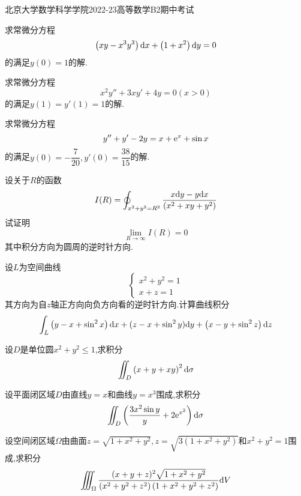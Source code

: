 \documentclass{ctexart}
\begin{document}
\pagestyle{empty}
\begin{center}\Large
    北京大学数学科学学院2022-23高等数学B2期中考试
\end{center}
\begin{problem}[1.(10\songti{分})]
    求常微分方程
    \[\left(xy-x^3y^3\right)\mathrm{d} x+\left(1+x^2\right)\mathrm{d} y=0\]
    的满足$y(0)=1$的解.
\end{problem}

\begin{problem}[2.(10\songti{分})]
    求常微分方程
    \[x^2y''+3xy'+4y=0(x>0)\]
    的满足$y(1)=y'(1)=1$的解.
\end{problem}

\begin{problem}[3.(10\songti{分})]
    求常微分方程
    \[y''+y'-2y=x+\mathrm{e}^x+\sin x\]
    的满足$y(0)=-\dfrac{7}{20},y'(0)=\dfrac{38}{15}$的解.
\end{problem}

\begin{problem}[4.(10\songti{分})]
    设关于$R$的函数
    \[I(R)=\oint_{x^2+y^2=R^2}\dfrac{x\mathrm{d} y-y\mathrm{d} x}{\left(x^2+xy+y^2\right)}\]
    试证明
    \[\lim_{R\to\infty}I(R)=0\]
    其中积分方向为圆周的逆时针方向.
\end{problem}

\begin{problem}[5.(10\songti{分})]
    设$L$为空间曲线
    \[\left\{\begin{array}{l}
        x^2+y^2=1\\
        x+z=1
    \end{array}\right.\]
    其方向为自$z$轴正方向向负方向看的逆时针方向.计算曲线积分
    \[\int_{L}\left(y-x+\sin^2x\right)\mathrm{d} x+(z-x+\sin^2y)\mathrm{d} y+\left(x-y+\sin^2z\right)\mathrm{d} z\]

\end{problem}

\begin{problem}[6.(10\songti{分})]
    设$D$是单位圆$x^2+y^2\leqslant1$,求积分
    \[\iint_D\left(x+y+xy\right)^2\mathrm{d}\sigma\]

\end{problem}

\begin{problem}[7.(10\songti{分})]
    设平面闭区域$D$由直线$y=x$和曲线$y=x^3$围成,求积分
    \[\iint_D\left(\dfrac{3x^2\sin y}{y}+2\mathrm{e}^{x^2}\right)\mathrm{d}\sigma\]

\end{problem}

\begin{problem}[8.(10\songti{分})]
    设空间闭区域$\Omega$由曲面$z=\sqrt{1+x^2+y^2},z=\sqrt{3\left(1+x^2+y^2\right)}$和$x^2+y^2=1$围成,求积分
    \[\iiint_{\Omega}\dfrac{(x+y+z)^2\sqrt{1+x^2+y^2}}{\left(x^2+y^2+z^2\right)\left(1+x^2+y^2+z^2\right)}\mathrm{d} V\]

\end{problem}
\end{document}
